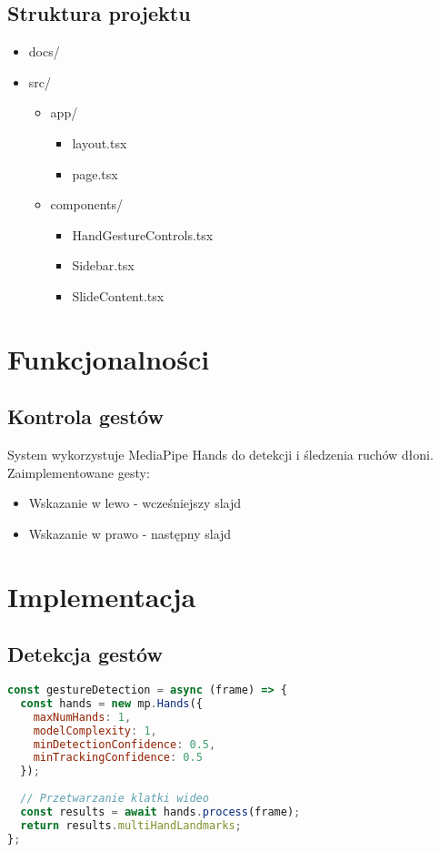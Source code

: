 \documentclass[12pt,a4paper]{article}
\begin{document}
\subsection{Struktura projektu}
\begin{itemize}
    \item docs/
    \item src/
    \begin{itemize}
        \item app/
        \begin{itemize}
            \item layout.tsx
            \item page.tsx
        \end{itemize}
        \item components/
        \begin{itemize}
            \item HandGestureControls.tsx
            \item Sidebar.tsx
            \item SlideContent.tsx
        \end{itemize}
    \end{itemize}
\end{itemize}

\section{Funkcjonalności}
\subsection{Kontrola gestów}
System wykorzystuje MediaPipe Hands do detekcji i śledzenia ruchów dłoni. Zaimplementowane gesty:
\begin{itemize}
    \item Wskazanie w lewo - wcześniejszy slajd
    \item Wskazanie w prawo - następny slajd
\end{itemize}

\section{Implementacja}
\subsection{Detekcja gestów}
\begin{lstlisting}[language=JavaScript]
const gestureDetection = async (frame) => {
  const hands = new mp.Hands({
    maxNumHands: 1,
    modelComplexity: 1,
    minDetectionConfidence: 0.5,
    minTrackingConfidence: 0.5
  });
  
  // Przetwarzanie klatki wideo
  const results = await hands.process(frame);
  return results.multiHandLandmarks;
};
\end{lstlisting}
\end{document}

